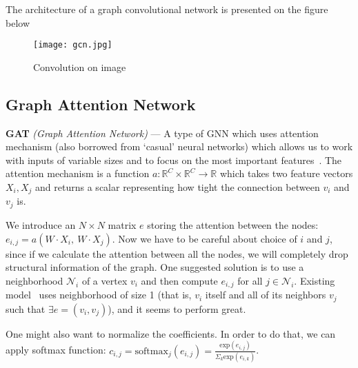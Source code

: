 The architecture of a graph convolutional network is presented on the figure below~\cite{simplifying_gcn}
\begin{figure}[h]
	\centering
	\texttt{[image: gcn.jpg]}
	\caption{Convolution on image}
\end{figure}

\subsection*{Graph Attention Network}

\textbf{GAT} \textit{(Graph Attention Network)} --- A type of GNN which uses attention mechanism (also borrowed from `casual' neural networks) which allows us to work with inputs of variable sizes and to focus on the most important features~\cite{Veličković_Cucurull_Casanova_Romero_Liò_Bengio_2018}.
The attention mechanism is a function $a: \mathbb{R}^C \times \mathbb{R}^C \rightarrow \mathbb{R}$ which takes two feature vectors $X_i, X_j$ and returns a scalar representing how tight the connection between $v_i$ and $v_j$ is.

We introduce an $N \times N$ matrix $e$ storing the attention between the nodes: $e_{i, j} = a\left( W \cdot X_i,\ W \cdot X_j \right)$.
Now we have to be careful about choice of $i$ and $j$, since if we calculate the attention between all the nodes, we will completely drop structural information of the graph.
One suggested solution is to use a neighborhood $\mathcal{N}_i$ of a vertex $v_i$ and then compute $e_{i, j}$ for all $j \in \mathcal{N}_i$.
Existing model~\cite{Veličković_Cucurull_Casanova_Romero_Liò_Bengio_2018} uses neighborhood of size 1 (that is, $v_i$ itself and all of its neighbors $v_j$ such that $\exists e = (v_i, v_j)$), and it seems to perform great.

One might also want to normalize the coefficients.
In order to do that, we can apply softmax function: $c_{i, j} = \text{softmax}_j \left( e_{i, j} \right) = \frac{\text{exp} \left( e_{i, j} \right)}{\Sigma_k \text{exp} \left( e_{i, k} \right) }$.
